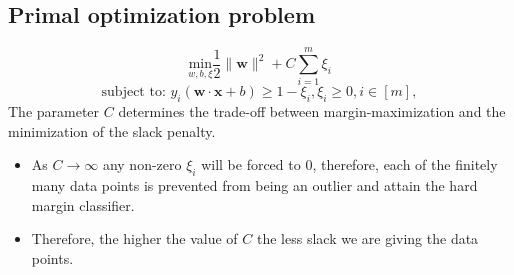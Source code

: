 \subsection{Primal optimization problem}
$$\underset{w,b, \xi}{\text{min}} \frac{1}{2} \|\mathbf{w}\|^2 + C \sum_{i=1}^{m} \xi_i$$
$$\text{subject to: } y_i(\mathbf w \cdot \mathbf x + b)  \geq 
1 - \xi_i, \xi_{i} \geq 0, i \in [m],$$
The parameter $C$ determines the trade-off between margin-maximization  and the minimization of the slack penalty.
\begin{itemize}
    \item As $C \to \infty$ any non-zero $\xi_i$ will be forced to 0, therefore, each of the finitely many data points is prevented from being an outlier and attain the hard margin classifier.
    \item Therefore, the higher the value of $C$ the less slack we are giving the data points.
\end{itemize}